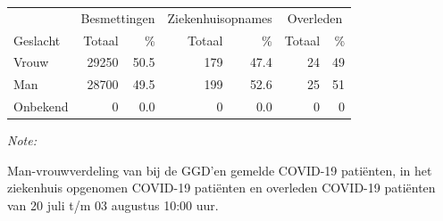 \documentclass[
  english,
  man,floatsintext]{apa6}
\begin{document}
\begin{table}
\centering\begingroup\fontsize{11}{13}\selectfont

\begin{threeparttable}
\begin{tabular}{lrrrrrr}
\toprule
\multicolumn{1}{c}{ } & \multicolumn{2}{c}{Besmettingen} & \multicolumn{2}{c}{Ziekenhuisopnames} & \multicolumn{2}{c}{Overleden} \\
\cmidrule(l{3pt}r{3pt}){2-3} \cmidrule(l{3pt}r{3pt}){4-5} \cmidrule(l{3pt}r{3pt}){6-7}
Geslacht & Totaal & \% & Totaal & \% & Totaal & \%\\
\midrule
Vrouw & 29250 & 50.5 & 179 & 47.4 & 24 & 49\\
Man & 28700 & 49.5 & 199 & 52.6 & 25 & 51\\
Onbekend & 0 & 0.0 & 0 & 0.0 & 0 & 0\\
\bottomrule
\end{tabular}
\begin{tablenotes}
\item \textit{Note: } 
\item Man-vrouwverdeling van bij de GGD’en gemelde COVID-19 patiënten, in het ziekenhuis opgenomen COVID-19 patiënten en overleden COVID-19 patiënten van 20 juli t/m 03 augustus 10:00 uur.
\end{tablenotes}
\end{threeparttable}
\endgroup{}
\end{table}
\newpage
\end{document}
